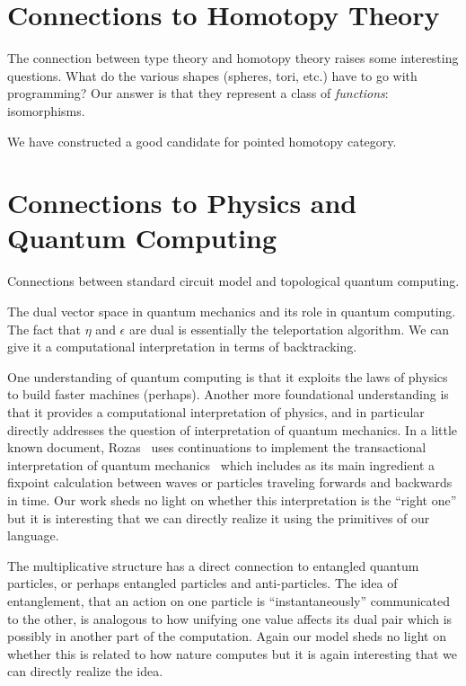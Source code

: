 \documentclass[11pt]{article}
\begin{document}
\section{Connections to Homotopy Theory} 

The connection between type theory and homotopy theory raises some
interesting questions. What do the various shapes (spheres, tori, etc.) have
to go with programming? Our answer is that they represent a class
of \emph{functions}: isomorphisms.

We have constructed a good candidate for pointed homotopy category.

\section{Connections to Physics and Quantum Computing} 

Connections between standard circuit model and topological quantum computing.

The dual vector space in quantum mechanics and its role in quantum
computing. The fact that $\eta$ and $\epsilon$ are dual is essentially the
teleportation algorithm. We can give it a computational interpretation in
terms of backtracking.

One understanding of quantum computing is that it exploits the laws of physics
to build faster machines (perhaps). Another more foundational understanding
is that it provides a computational interpretation of physics, and in
particular directly addresses the question of interpretation of quantum
mechanics. In a little known document, Rozas~\cite{Rozas:1987:CMO:889539}
uses continuations to implement the transactional interpretation of quantum
mechanics~\cite{transactional} which includes as its main ingredient a
fixpoint calculation between waves or particles traveling forwards and
backwards in time. Our work sheds no light on whether this interpretation is
the ``right one'' but it is interesting that we can directly realize it using
the primitives of our language.

The multiplicative structure has a direct connection to entangled quantum
particles, or perhaps entangled particles and anti-particles.  The idea of
entanglement, that an action on one particle is ``instantaneously''
communicated to the other, is analogous to how unifying one value affects its
dual pair which is possibly in another part of the computation.  Again our
model sheds no light on whether this is related to how nature computes but it
is again interesting that we can directly realize the idea.
\end{document}
